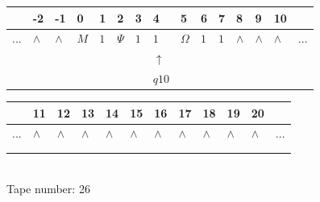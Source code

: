 \documentclass[11pt]{article}
\begin{document}
\begin{table}[H]
\centering
\begin{tabular}{lllllllllllllll}
 & -2 & -1 & 0 & 1 & 2 & 3 & 4 & 5 & 6 & 7 & 8 & 9 & 10 & \\
\hline
$...$ & \multicolumn{1}{|l|}{$\wedge$} & \multicolumn{1}{|l|}{$\wedge$} & \multicolumn{1}{|l|}{$M$} & \multicolumn{1}{|l|}{$1$} & \multicolumn{1}{|l|}{$\Psi$} & \multicolumn{1}{|l|}{$1$} & \multicolumn{1}{|l|}{$1$} & \multicolumn{1}{|l|}{$\Omega$} & \multicolumn{1}{|l|}{$1$} & \multicolumn{1}{|l|}{$1$} & \multicolumn{1}{|l|}{$\wedge$} & \multicolumn{1}{|l|}{$\wedge$} & \multicolumn{1}{|l|}{$\wedge$} & $...$\\
\hline
&  &  &  &  &  &  & $\uparrow$ &  &  &  &  &  &  &  \\
&  &  &  &  &  &  & $ q10 $ &  &  &  &  &  &  &  \\
\end{tabular}
\begin{tabular}{llllllllllll}
 & 11 & 12 & 13 & 14 & 15 & 16 & 17 & 18 & 19 & 20 & \\
\hline
$...$ & \multicolumn{1}{|l|}{$\wedge$} & \multicolumn{1}{|l|}{$\wedge$} & \multicolumn{1}{|l|}{$\wedge$} & \multicolumn{1}{|l|}{$\wedge$} & \multicolumn{1}{|l|}{$\wedge$} & \multicolumn{1}{|l|}{$\wedge$} & \multicolumn{1}{|l|}{$\wedge$} & \multicolumn{1}{|l|}{$\wedge$} & \multicolumn{1}{|l|}{$\wedge$} & \multicolumn{1}{|l|}{$\wedge$} & $...$\\
\hline
&  &  &  &  &  &  &  &  &  &  &  \\
&  &  &  &  &  &  &  &  &  &  &  \\
\end{tabular}
\\
Tape number: 26
\noindent\makebox[\linewidth]{\hdashrule{\textwidth}{1pt}{1pt}}\end{table}
\end{document}

